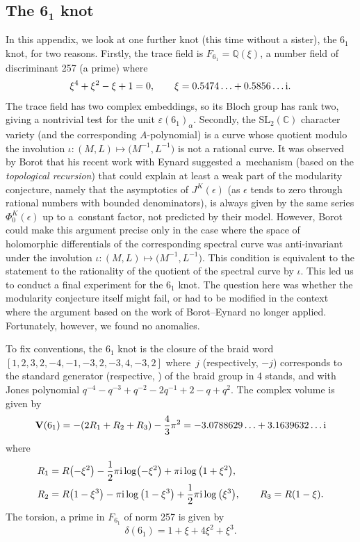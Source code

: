 \documentclass[pdftex]{sigma}
\numberwithin{equation}{section}
\def\BQ{\mathbb Q}
\def\BC{\mathbb C}
\def\ep{\epsilon}
\def\SL{\mathrm{SL}}
\def\a{\alpha}
\def\a{\alpha}
\def\J{\mathbf J} \def\J{J} %
\def\V{\mathbf V}
\def\ve{\varepsilon}
\begin{document}
\subsection[The 6\_1 knot]{The $\boldsymbol{6_1}$ knot}
\label{sub.61}

In this appendix, we look at one further knot (this time without a sister), the
$6_1$ knot, for two reasons. Firstly, the trace field
is $F_{6_1} = \BQ(\xi)$, a number field of discriminant 257 (a prime) where
\[
\xi^4 + \xi^2 - \xi + 1=0, \qquad \xi=0.5474\ldots + 0.5856\dots {\rm i}.
\]
The trace field has two complex embeddings, so its Bloch group has rank
two, giving a nontrivial test for the unit $\ve(6_1)_\a$. Secondly,
the $\SL_2(\BC)$ character variety (and the corresponding $A$-polynomial)
is a curve whose quotient modulo the involution
$\iota\colon (M,L)\mapsto \big(M^{-1},L^{-1}\big)$ is not a rational curve.
It was observed by Borot that his recent work with Eynard
\cite{BE} suggested a~mechanism (based on the {\em topological recursion})
that could explain at least a weak part of the modularity conjecture, namely
that the asymptotics of $\J^K(\ep)$ (as $\ep$ tends to zero through rational
numbers with bounded denominators), is always given by the same series
$\Phi^K_0(\ep)$ up to a~constant factor, not predicted by their model.
However, Borot could make this argument precise only in the case where the
space of holomorphic differentials of the corresponding spectral curve
was anti-invariant under the involution
$\iota\colon (M,L)\mapsto \big(M^{-1},L^{-1}\big)$. This condition is equivalent to
the statement to the rationality of the quotient of the spectral curve by
$\iota$. This led us to conduct a final experiment for the $6_1$ knot.
The question here was whether the modularity conjecture itself might fail,
or had to be modified in the context where the argument based on the work
of Borot--Eynard no longer applied. Fortunately, however, we found no anomalies.

To fix conventions, the $6_1$ knot is the closure of the braid word
{\tiny $[1, 2, 3, 2, -4, -1, -3, 2, -3, 4, -3, 2]$} where~$j$ (respectively,
$-j$) corresponds to the standard generator  \big(respective, \big)
of the braid group in 4 stands, and
with Jones polynomial $q^{-4} - q^{-3} + q^{-2} - 2 q^{-1} + 2 - q + q^2$.
The complex volume is given by
\[
\V(6_1)= -(2 R_1+R_2+R_3) - \frac{4}{3} \pi^2
= -3.0788629 \ldots + 3.1639632 \ldots {\rm i}
\]
where
\begin{align*}
R_1 &= R\bigl(-\xi^2\bigr) - \frac{1}{2} \pi{\rm i} \log\bigl(-\xi^2\bigr) + \pi{\rm i} \log\big(1+\xi^2\big), \\
R_2 &= R\big(1-\xi^3\big)- \pi{\rm i} \log\big(1-\xi^3\big) + \frac{1}{2} \pi{\rm i} \log\big(\xi^3\big), \qquad
R_3 = R(1-\xi) .
\end{align*}
The torsion, a prime in $F_{6_1}$ of norm 257 is given by
\[
\delta(6_1)= 1+\xi+4 \xi^2+\xi^3 .
\]
\end{document}
